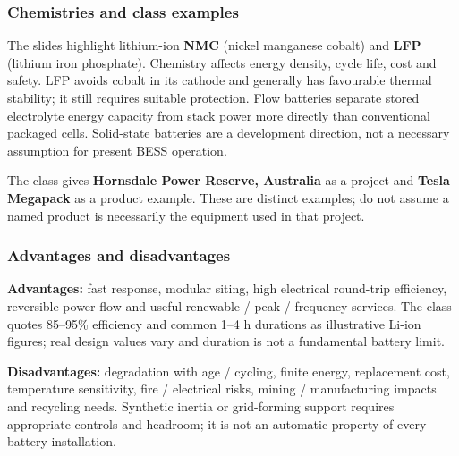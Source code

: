 \documentclass[11pt,a4paper]{article}
\begin{document}
\subsubsection{Chemistries and class examples}
The slides highlight lithium-ion \textbf{NMC} (nickel manganese cobalt) and \textbf{LFP} (lithium iron phosphate). Chemistry affects energy density, cycle life, cost and safety. LFP avoids cobalt in its cathode and generally has favourable thermal stability; it still requires suitable protection. Flow batteries separate stored electrolyte energy capacity from stack power more directly than conventional packaged cells. Solid-state batteries are a development direction, not a necessary assumption for present BESS operation.

The class gives \textbf{Hornsdale Power Reserve, Australia} as a project and \textbf{Tesla Megapack} as a product example. These are distinct examples; do not assume a named product is necessarily the equipment used in that project.

\subsubsection{Advantages and disadvantages}
\textbf{Advantages:} fast response, modular siting, high electrical round-trip efficiency, reversible power flow and useful renewable / peak / frequency services. The class quotes 85--95\% efficiency and common 1--4 h durations as illustrative Li-ion figures; real design values vary and duration is not a fundamental battery limit.

\textbf{Disadvantages:} degradation with age / cycling, finite energy, replacement cost, temperature sensitivity, fire / electrical risks, mining / manufacturing impacts and recycling needs. Synthetic inertia or grid-forming support requires appropriate controls and headroom; it is not an automatic property of every battery installation.
\end{document}
